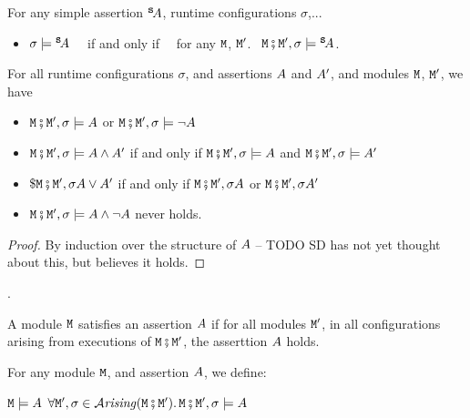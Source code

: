 \begin{lemma}
For any simple assertion ${^{\small{{\mbox{\tt{s}}}}}\! A}$, runtime configurations $\sigma$,...
\begin{itemize}
\item $\sigma \models {^{\small{{\mbox{\tt{s}}}}}\! A}$ \ \ if and only if \ \  for any ${\mbox{\tt{M}}}$, ${\mbox{\tt{M}}}'$. \, ${\mbox{\tt{M}}}\fatsemi {\mbox{\tt{M}}}', \sigma \models{^{\small{{\mbox{\tt{s}}}}}\! A}$.
\end{itemize}
\end{lemma}
 
\begin{lemma}
For all runtime configurations $\sigma$, and   assertions $A$ and $A'$, and modules
${\mbox{\tt{M}}}$, ${\mbox{\tt{M}}}'$,
we have
\label{lemma:simple_assertions_classical}
\begin{itemize}
\item
${\mbox{\tt{M}}}\fatsemi {\mbox{\tt{M}}}', \sigma \models A$ or  ${\mbox{\tt{M}}}\fatsemi {\mbox{\tt{M}}}', \sigma \models \neg A$
\item
${\mbox{\tt{M}}}\fatsemi {\mbox{\tt{M}}}', \sigma \models A \wedge A'$ \SP if and only if \SP  ${\mbox{\tt{M}}}\fatsemi {\mbox{\tt{M}}}', \sigma \models A$ and  ${\mbox{\tt{M}}}\fatsemi {\mbox{\tt{M}}}', \sigma \models A'$ 
\item
$\${\mbox{\tt{M}}}\fatsemi {\mbox{\tt{M}}}', \sigma A \vee A'$ \SP if and only if \SP ${\mbox{\tt{M}}}\fatsemi {\mbox{\tt{M}}}', \sigma A$ or  ${\mbox{\tt{M}}}\fatsemi {\mbox{\tt{M}}}', \sigma A'$ 
\item
${\mbox{\tt{M}}}\fatsemi {\mbox{\tt{M}}}', \sigma\models A \wedge \neg A$ never holds.
\end{itemize}
\end{lemma}
\begin{proof} By induction over the structure of $A$ -- TODO  SD has not yet thought about this, but believes it holds. \end{proof}.

A module ${\mbox{\tt{M}}}$ satisfies an assertion $A$ if for all modules ${\mbox{\tt{M}}}'$, in all configurations arising from executions of ${\mbox{\tt{M}}}\fatsemi{\mbox{\tt{M}}}'$, the asserttion $A$ holds.

\begin{definition}
\label{def:module_satisfies}
For any module ${\mbox{\tt{M}}}$, and  assertion $A$, we define:

${\mbox{\tt{M}}} \models A$ \IFF  $\forall {\mbox{\tt{M}}}',\sigma\in {{\mathcal{A}}\textrm{\textit{rising}}(\ensuremath{{\mbox{\tt{M}}}}\fatsemi\ensuremath{{\mbox{\tt{M}}}}')}. \, {\mbox{\tt{M}}}\fatsemi{\mbox{\tt{M}}}', \sigma \models A$
\end{definition}

